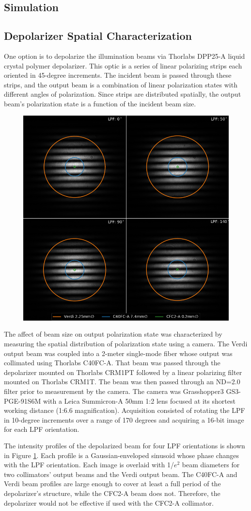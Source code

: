\subsection{Simulation}

\subsection{Depolarizer Spatial Characterization}
One option is to depolarize the illumination beams via Thorlabs DPP25-A liquid crystal polymer depolarizer. This optic is a series of linear polarizing strips each oriented in 45-degree increments. The incident beam is passed through these strips, and the output beam is a combination of linear polarization states with different angles of polarization. Since strips are distributed spatially, the output beam's polarization state is a function of the incident beam size.

\begin{figure}
    \centering
    \includegraphics[width=0.5\linewidth]{figures/depol_spatial.png}
    \caption{}
    \label{fig:depol_spatial}
\end{figure}

The affect of beam size on output polarization state was characterized by measuring the spatial distribution of polarization state using a camera. The Verdi output beam was coupled into a 2-meter single-mode fiber whose output was collimated using Thorlabs C40FC-A. That beam was passed through the depolarizer mounted on Thorlabs CRM1PT followed by a linear polarizing filter mounted on Thorlabs CRM1T. The beam was then passed through an ND=2.0 filter prior to measurement by the camera. The camera was Grasshopper3 GS3-PGE-91S6M with a Leica Summicron-A 50mm 1:2 lens focused at its shortest working distance (1:6.6 magnification). Acquisition consisted of rotating the LPF in 10-degree increments over a range of 170 degrees and acquiring a 16-bit image for each LPF orientation.

The intensity profiles of the depolarized beam for four LPF orientations is shown in Figure \ref{fig:depol_spatial}. Each profile is a Gaussian-enveloped sinusoid whose phase changes with the LPF orientation. Each image is overlaid with 1/$e^2$ beam diameters for two collimators' output beams and the Verdi output beam. The C40FC-A and Verdi beam profiles are large enough to cover at least a full period of the depolarizer's structure, while the CFC2-A beam does not. Therefore, the depolarizer would not be effective if used with the CFC2-A collimator.

